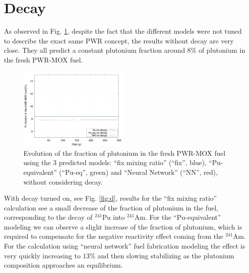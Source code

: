 \documentclass{anstrans}
\begin{document}
\section{Decay}

As observed in Fig. \ref{fig:nod}, despite the fact that the different models 
were not tuned to
describe the exact same PWR concept, the results without decay are very
close. They all predict a constant plutonium fraction around $8\%$ of plutonium
in the fresh PWR-MOX fuel.

\begin{figure}[ht] %
  \centering
  \includegraphics[width=0.48\textwidth]{nodecay_pu_contribution.png}
  \caption{Evolution of the fraction of plutonium in the fresh PWR-MOX fuel
  using the 3 predicted models: ``fix mixing ratio'' (``fix'', blue), ``Pu-equivalent''
  (``Pu-eq'', green) and ``Neural Network'' (``NN'', red), without considering decay.}
  \label{fig:nod}
\end{figure}


With decay turned on, see Fig. \ref{fig:d}, results for the ``fix mixing ratio''
calculation see a small decrease of the fraction of plutonium in the fuel,
corresponding to the decay of $^{241}$Pu into $^{241}$Am.  For the
``Pu-equivalent'' modeling we can observe a slight increase of the fraction of
plutonium, which is required to compensate for the negative reactivity effect
coming from the $^{241}$Am. For the calculation using ``neural network'' fuel
fabrication modeling the effect is very quickly increasing to $13\%$ and then
slowing stabilizing as the plutonium composition approaches an equilibrium.
\end{document}
